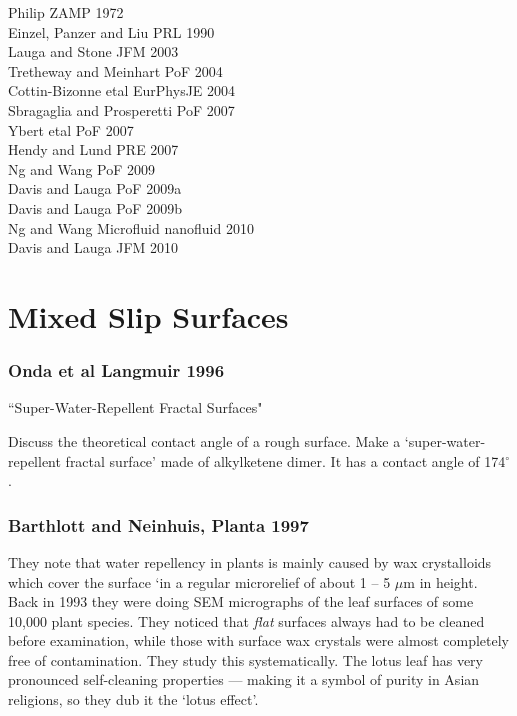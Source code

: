 \documentclass{article}
\begin{document}
\begin{itemize}
Philip ZAMP 1972 \\
Einzel, Panzer and Liu PRL 1990 \\
Lauga and Stone JFM 2003 \\
Tretheway and Meinhart  PoF 2004 \\
Cottin-Bizonne etal EurPhysJE 2004 \\
Sbragaglia and Prosperetti PoF 2007 \\
Ybert etal PoF 2007 \\
Hendy and Lund PRE 2007 \\
Ng and Wang PoF 2009 \\
Davis and Lauga PoF 2009a \\
Davis and Lauga PoF 2009b \\
Ng and Wang Microfluid nanofluid 2010 \\
Davis and Lauga JFM 2010 \\

\end{itemize}

\section*{Mixed Slip Surfaces}

\subsubsection*{Onda et al Langmuir 1996}
``Super-Water-Repellent Fractal Surfaces"

Discuss the theoretical contact angle of a rough surface.  Make a `super-water-repellent fractal surface' made of alkylketene dimer.  It has a contact angle of 174$^{\circ}$.

\subsubsection*{Barthlott and Neinhuis, Planta 1997}
They note that water repellency in plants is mainly caused by wax crystalloids which cover the surface `in a regular microrelief of about 1 -- 5 $\mu$m in height.
Back in 1993 they were doing SEM micrographs of the leaf surfaces of some 10,000 plant species.  They noticed that \emph{flat} surfaces always had to be cleaned before examination, while those with surface wax crystals were almost completely free of contamination.  They study this systematically.  The lotus leaf has very pronounced self-cleaning properties  --- making it a symbol of purity in Asian religions, so they dub it the `lotus effect'.
\end{document}
